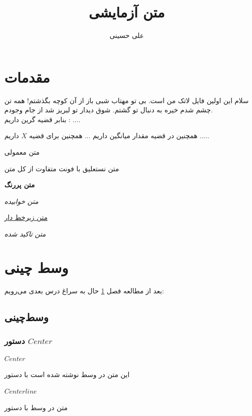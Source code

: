 \documentclass[12pt]{book}
\title{متن آزمایشی}
\author{علی حسینی }
\begin{document}
\maketitle
\chapter{مقدمات}\label{chap1}
	سلام این اولین فایل لاتک من است.
	  بی تو مهتاب شبی باز از آن کوچه بگذشتم! همه تن چشم شدم خیره به دنبال تو گشتم. شوق دیدار تو لبریز شد از جام وجودم.  \\ بنابر قضیه گرین داریم : ....
	 
	  همچنین در قضیه مقدار میانگین داریم ...
	  همچنین برای قضیه $X$  داریم .....

\textrm{متن معمولی} 

{\Huge \nast  متن نستعلیق با فونت متفاوت از کل متن }

\textbf{متن پررنگ}

\textit{متن خوابیده}

\underline{متن زیرخط دار}


\emph{متن تاکید شده}

\chapter{وسط چینی}\label{chap2}
	بعد از مطالعه فصل \ref{chap1} حال به سراغ درس بعدی می‌رویم:
\section{وسط‌چینی}
\subsection{دستور $Center$}
\subsubsection{$Center$}
\begin{center}

	
	این متن در وسط نوشته شده است با دستور 
\end{center}
\subsubsection{$Center line$}
\centerline{متن در وسط با دستور }
\end{document}
